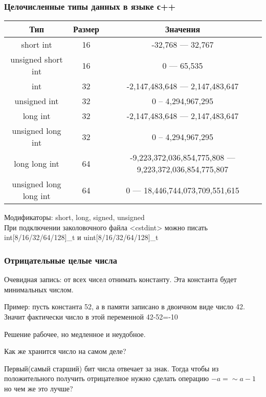 \begin{frame}
    \frametitle{Целочисленные типы данных в языке с++}

    \begin{center}
        \small
        \begin{tabular}{|c|c|c|}
            \hline
            Тип & Размер & Значения \\
            \hline
            short int & 16 & -32,768 --- 32,767\\
            \hline
            unsigned short int & 16 & 0 --- 65,535\\
            \hline
            int & 32 & -2,147,483,648 --- 2,147,483,647\\
            \hline
            unsigned int & 32 & 0 -- 4,294,967,295\\
            \hline
            long int & 32 & -2,147,483,648 --- 2,147,483,647\\
            \hline
            unsigned long int & 32 & 0 -- 4,294,967,295\\
            \hline
            long long int & 64 & -9,223,372,036,854,775,808 --- 9,223,372,036,854,775,807\\
            \hline
            unsigned long long int & 64 & 0 --- 18,446,744,073,709,551,615\\
            \hline
        \end{tabular}
    \end{center}

    \quad Модификаторы: short, long, signed, unsigned\\
    \quad При подключении заколовочного файла <cstdint> можно писать int[8/16/32/64/128]\_t и uint[8/16/32/64/128]\_t
\end{frame}


\begin{frame}
    \frametitle{Отрицательные целые числа}
    \quad Очевидная запись: от всех чисел отнимать константу. Эта константа будет минимальных числом.

    \quad Пример: пусть константа 52, а в памяти записано в двоичном виде число 42. Значит фактически число в этой переменной 42-52=-10   

    \quad Решение рабочее, но медленное и неудобное.

    \quad Как же хранится число на самом деле? 

    \quad Первый(самый старший) бит числа отвечает за знак. Тогда чтобы из положительного получить отрицателное нужно сделать операцию $-a = \sim a - 1$ но чем же это лучше?
\end{frame}

